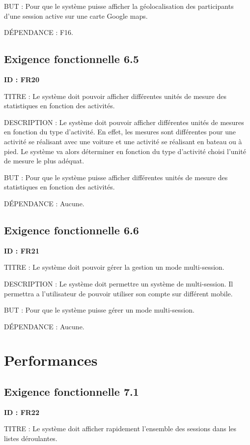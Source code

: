 \documentclass[titlepage, 12pt]{report}
\begin{document}
BUT : Pour que le système puisse afficher la géolocalisation des participants d'une session active sur une carte Google maps.

DÉPENDANCE : F16.

\subsection{Exigence fonctionnelle 6.5}

\textbf{ID : FR20}

TITRE : Le système doit pouvoir afficher différentes unités de mesure des statistiques en fonction des activités.

DESCRIPTION : Le système doit pouvoir afficher différentes unités de mesures en fonction du type d'activité. En effet, les mesures sont différentes pour une activité se réalisant avec une voiture et une activité se réalisant en bateau ou à pied. Le système va alors déterminer en fonction du type d'activité choisi l'unité de mesure le plus adéquat.

BUT : Pour que le système puisse afficher différentes unités de mesure des statistiques en fonction des activités.

DÉPENDANCE : Aucune.

\subsection{Exigence fonctionnelle 6.6}

\textbf{ID : FR21}

TITRE : Le système doit pouvoir gérer la gestion un mode multi-session.

DESCRIPTION : Le système doit permettre un système de multi-session. Il permettra a l'utilisateur de pouvoir utiliser son compte sur différent mobile.

BUT : Pour que le système puisse gérer un mode multi-session.

DÉPENDANCE : Aucune.

\section{Performances}

\subsection{Exigence fonctionnelle 7.1}

\textbf{ID : FR22}

TITRE : Le système doit afficher rapidement l'ensemble des sessions dans les listes déroulantes.
\end{document}
